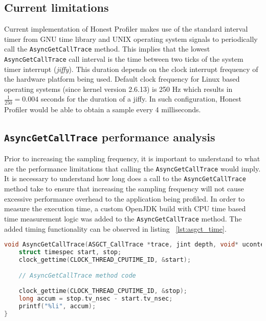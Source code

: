 \documentclass[..thesis.tex]{subfiles}
\begin{document}
\subsection{Current limitations}
Current implementation of Honest Profiler makes use of the standard interval timer from GNU time library and UNIX operating system signals to periodically call the \texttt{AsyncGetCallTrace} method. This implies that the lowest \texttt{Async\-Get\-Call\-Trace} call interval is the time between two ticks of the system timer interrupt (\textit{jiffy}). This duration depends on the clock interrupt frequency of the hardware platform being used. Default clock frequency for Linux based operating systems (since kernel version 2.6.13) is 250 Hz which results in $\frac{1}{250} = 0.004$ seconds for the duration of a jiffy. \cite{linux_time} In such configuration, Honest Profiler would be able to obtain a sample every 4 milliseconds.



\subsection{\texttt{AsyncGetCallTrace} performance analysis}
Prior to increasing the sampling frequency, it is important to understand to what are the performance limitations that calling the \texttt{Async\-Get\-Call\-Trace} would imply. It is necessary to understand how long does a call to the \texttt{Async\-Get\-Call\-Trace} method take  to ensure that increasing the sampling frequency will not cause excessive performance overhead to the application being profiled. In order to measure the execution time, a custom OpenJDK build with CPU time based time measurement logic was added to the \texttt{Async\-Get\-Call\-Trace} method. The added timing functionality can be observed in listing ~\ref{lst:asgct_time}.

\begin{lstlisting}[language=C++,style=def,label={lst:asgct_time}, caption={CPU time based measurement in \texttt{AsyncGetCallTrace} method}]
void AsyncGetCallTrace(ASGCT_CallTrace *trace, jint depth, void* ucontext) {
    struct timespec start, stop;
    clock_gettime(CLOCK_THREAD_CPUTIME_ID, &start);

    // AsyncGetCallTrace method code
    
    clock_gettime(CLOCK_THREAD_CPUTIME_ID, &stop);
    long accum = stop.tv_nsec - start.tv_nsec;
    printf("%li", accum);
}
\end{lstlisting}
\end{document}
